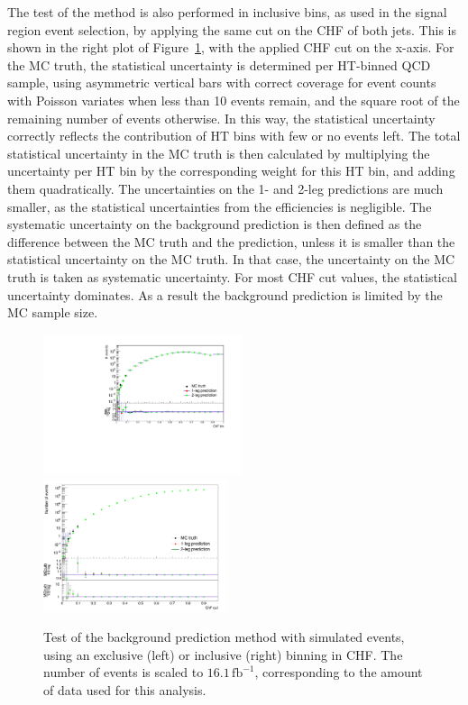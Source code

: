 The test of the method is also performed in inclusive bins, as used in the signal region event selection, by applying the same cut on the CHF of both jets. This is shown in the right plot of Figure~\ref{fig:closuretest}, with the applied CHF cut on the x-axis. For the MC truth, the statistical uncertainty is determined  per HT-binned \ac{QCD} sample, using asymmetric vertical bars with correct coverage for event counts with Poisson variates when less than 10 events remain, and the square root of the remaining number of events otherwise. In this way, the statistical uncertainty correctly reflects the contribution of HT bins with few or no events left. The total statistical uncertainty in the MC truth is then calculated by multiplying the uncertainty per HT bin by the corresponding weight for this HT bin, and adding them quadratically. The uncertainties on the 1- and 2-leg predictions are much smaller, as the statistical uncertainties from the efficiencies is negligible. The systematic uncertainty on the background prediction is then defined as the difference between the MC truth and the prediction, unless it is smaller than the statistical uncertainty on the MC truth. In that case, the uncertainty on the MC truth is taken as systematic uncertainty. For most CHF cut values, the statistical uncertainty dominates. As a result the background prediction is limited by the MC sample size.

\begin{figure}[ht]
  \includegraphics[width=0.52\textwidth]{figures/closure_test_QCD_exclusive_filters.pdf}%
  \includegraphics[width=0.48\textwidth]{figures/closure_test.pdf}\hfill
  \caption{Test of the background prediction method with simulated events, using an exclusive (left) or inclusive (right) binning in CHF. The number of events is scaled to $16.1\, \mathrm{fb}^{-1}$, corresponding to the amount of data used for this analysis.}
  \label{fig:closuretest}
\end{figure}

